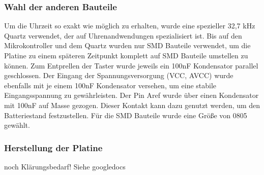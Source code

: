 \subsubsection{Wahl der anderen Bauteile}
Um die Uhrzeit so exakt wie möglich zu erhalten, wurde eine spezieller 32,7 kHz Quartz verwendet, der auf Uhrenandwendungen spezialisiert ist. Bis auf den Mikrokontroller und dem Quartz wurden nur SMD Bauteile verwendet, um die Platine zu einem späteren Zeitpunkt komplett auf SMD Bauteile umstellen zu können. Zum Entprellen der Taster wurde jeweils ein 100nF Kondensator parallel geschlossen. Der Eingang der Spannungsversorgung (VCC, AVCC) wurde ebenfalls mit je einem 100nF Kondensator versehen, um eine stabile Eingangsspannung zu gewährleisten. Der Pin Aref wurde über einen Kondensator mit 100nF auf Masse gezogen. Dieser Kontakt kann dazu genutzt werden, um den Batteriestand festzustellen. Für die SMD Bauteile wurde eine Größe von 0805 gewählt. 

\subsubsection{Herstellung der Platine}
noch Klärungsbedarf! Siehe googledocs